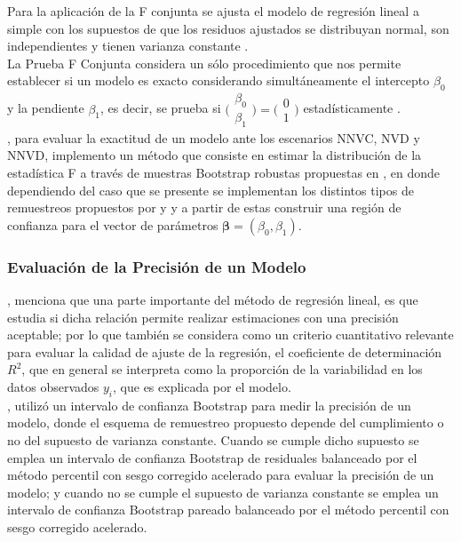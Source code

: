 Para la aplicación de la F conjunta se ajusta el modelo de regresión lineal a simple con los supuestos de que los residuos ajustados se distribuyan normal, son independientes y tienen varianza constante \parencite{ayala-2024}.\\

La Prueba F Conjunta considera un sólo procedimiento que nos permite establecer si un modelo es exacto considerando simultáneamente el intercepto \(\beta_0\) y la pendiente \(\beta_1\), es decir, se prueba si  {\Large $\bigl(\begin{smallmatrix} \beta_{0} \\ \beta_{1} \end{smallmatrix}\bigr) = \bigl(\begin{smallmatrix}0  \\  1\end{smallmatrix}\bigr) $} estadísticamente \parencite{zacarias-2023}.\\

\textcite{zacarias-2023}, para evaluar la exactitud de un modelo ante los escenarios NNVC, NVD y NNVD, implemento un método que consiste en estimar la distribución de la estadística F a través de muestras Bootstrap robustas propuestas en \textcite{rana-2012}, en donde dependiendo del caso que se presente se implementan los distintos tipos de remuestreos propuestos por \textcite{wu-1986} y \textcite{liu-1988} y a partir de estas construir una región de confianza para el vector de parámetros $ \mathbf{\beta} = (\beta_{0}, \beta_{1})$.\\


\subsubsection{Evaluación de la Precisión de un Modelo}

\textcite{zacarias-2023}, menciona que una parte importante del método de regresión lineal, es que estudia si dicha relación permite realizar estimaciones con una precisión aceptable; por lo que también se considera como un criterio cuantitativo relevante para evaluar la calidad de ajuste de la regresión, el coeficiente de determinación $R^{2}$, que en general se interpreta como la proporción de la variabilidad en los datos observados $y_{i}$, que es explicada por el modelo.\\


\textcite{balam-2012}, utilizó un intervalo de confianza Bootstrap para medir la precisión de un modelo, donde el esquema de remuestreo propuesto depende del cumplimiento o no del supuesto de varianza constante. Cuando se cumple dicho supuesto se emplea un intervalo de confianza Bootstrap de residuales balanceado por el método percentil con sesgo corregido acelerado para evaluar la precisión de un modelo; y cuando no se cumple el supuesto de varianza constante se emplea un intervalo de confianza Bootstrap pareado balanceado por el método percentil con sesgo corregido acelerado.\\

